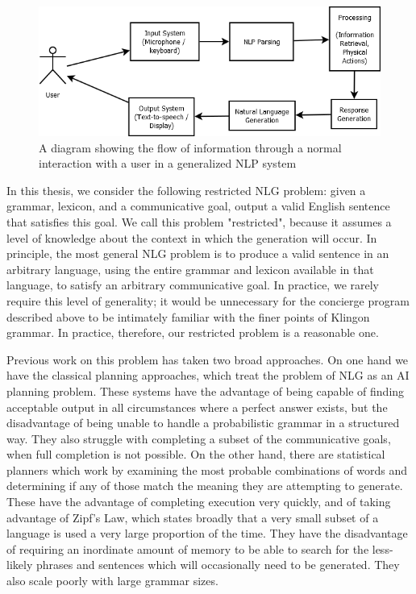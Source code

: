 \begin{figure}
\centering
\includegraphics[width=0.8 \linewidth]{nlp-block.png}
\caption{A diagram showing the flow of information through a normal interaction
with a user in a generalized NLP system}
\label{nlp-block}
\end{figure}

In this thesis, we consider the following restricted NLG problem: given a
grammar, lexicon, and a communicative goal, output a valid English
sentence that satisfies this goal.  We call this problem "restricted", because
it assumes a level of knowledge about the context in which the generation
will occur.  In principle, the most general NLG problem is to produce a valid
sentence in an arbitrary language, using the entire grammar and lexicon available
in that language, to satisfy an arbitrary communicative goal.  In practice, we
rarely require this level of generality; it would be unnecessary for the concierge
program described above to be intimately familiar with the finer points of Klingon grammar.
In practice, therefore, our restricted problem is a reasonable one.

Previous work on this problem has taken two broad approaches.  On one hand we have
the classical planning approaches, which treat the problem of NLG as an AI planning
problem.  These systems have the advantage of being capable of finding acceptable
output in all circumstances where a perfect answer exists, but the disadvantage of
being unable to handle a probabilistic grammar in a structured way.  They also struggle
with completing a subset of the communicative goals, when full completion is not
possible.  On the other hand, there are statistical planners which work by examining the
most probable combinations of words and determining if any of those match the
meaning they are attempting to generate.  These have the advantage of completing
execution very quickly, and of taking advantage of Zipf's Law, which states broadly that
a very small subset of a language is used a very large proportion of the time.  They
have the disadvantage of requiring an inordinate amount of memory to be able to search
for the less-likely phrases and sentences which will occasionally need to be generated.
They also scale poorly with large grammar sizes.

